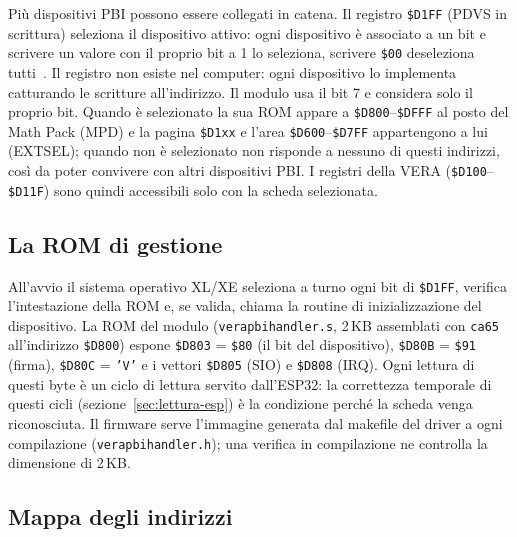 \documentclass[11pt,a4paper,twoside,openright]{report}
\DeclareRobustCommand{\code}[1]{\begingroup\renewcommand{\_}{\textunderscore\allowbreak}\texttt{#1}\endgroup}
\newcommand{\sig}[1]{\textsf{#1}}
\newcommand{\hex}[1]{\texttt{\$#1}}
\begin{document}
Più dispositivi PBI possono essere collegati in catena. Il registro \hex{D1FF} (PDVS in
scrittura) seleziona il dispositivo attivo: ogni dispositivo è associato a un bit e
scrivere un valore con il proprio bit a 1 lo seleziona, scrivere \hex{00} deseleziona
tutti~\cite[§10.2]{ahrm}. Il registro non esiste nel computer: ogni dispositivo lo
implementa catturando le scritture all'indirizzo. Il modulo usa il bit 7 e considera solo
il proprio bit. Quando è selezionato la sua ROM appare a \hex{D800}--\hex{DFFF} al posto
del Math Pack (\sig{MPD}) e la pagina \hex{D1xx} e l'area \hex{D600}--\hex{D7FF}
appartengono a lui (\sig{EXTSEL}); quando non è selezionato non risponde a nessuno di
questi indirizzi, così da poter convivere con altri dispositivi PBI. I registri della VERA
(\hex{D100}--\hex{D11F}) sono quindi accessibili solo con la scheda selezionata.

\subsection{La ROM di gestione}

All'avvio il sistema operativo XL/XE seleziona a turno ogni bit di \hex{D1FF}, verifica
l'intestazione della ROM e, se valida, chiama la routine di inizializzazione del
dispositivo. La ROM del modulo (\code{vera\_pbi\_handler.s}, 2\,KB assemblati con
\code{ca65} all'indirizzo \hex{D800}) espone \hex{D803} = \hex{80} (il bit del dispositivo),
\hex{D80B} = \hex{91} (firma), \hex{D80C} = \code{'V'} e i vettori \hex{D805} (SIO) e
\hex{D808} (IRQ). Ogni lettura di questi byte è un ciclo di lettura servito dall'ESP32: la
correttezza temporale di questi cicli (sezione~\ref{sec:lettura-esp}) è la condizione
perché la scheda venga riconosciuta. Il firmware serve l'immagine generata dal makefile del
driver a ogni compilazione (\code{vera\_pbi\_handler.h}); una verifica in compilazione ne
controlla la dimensione di 2\,KB.

\subsection{Mappa degli indirizzi}
\end{document}

